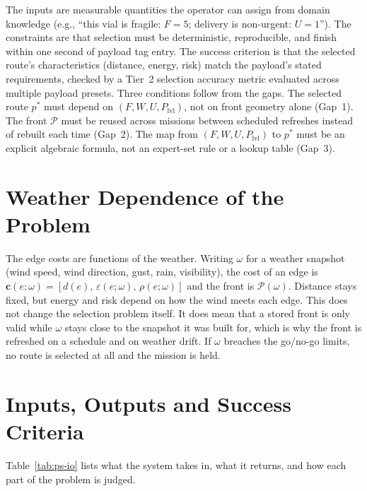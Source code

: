 \documentclass{ssnreview}
\begin{document}
The inputs are measurable quantities the operator can assign from domain knowledge (e.g.,
``this vial is fragile: $F = 5$; delivery is non-urgent: $U = 1$''). The constraints are
that selection must be deterministic, reproducible, and finish within one second of
payload tag entry. The success criterion is that the selected route's characteristics
(distance, energy, risk) match the payload's stated requirements, checked by a Tier~2
selection accuracy metric evaluated across multiple payload presets. Three conditions
follow from the gaps. The selected route $p^*$ must depend on $(F, W, U, P_\mathrm{lvl})$,
not on front geometry alone (Gap~1). The front $\mathcal{P}$ must be reused across
missions between scheduled refreshes instead of rebuilt each time (Gap~2). The map from
$(F, W, U, P_\mathrm{lvl})$ to $p^*$ must be an explicit algebraic formula, not an
expert-set rule or a lookup table (Gap~3).

\section{Weather Dependence of the Problem}

The edge costs are functions of the weather. Writing $\omega$ for a
weather snapshot (wind speed, wind direction, gust, rain, visibility), the cost of an
edge is $\mathbf{c}(e;\omega) = [d(e),\, \varepsilon(e;\omega),\, \rho(e;\omega)]$ and the
front is $\mathcal{P}(\omega)$. Distance stays fixed, but energy and risk depend on how
the wind meets each edge. This does not change the selection problem itself. It does mean
that a stored front is only valid while $\omega$ stays close to the snapshot it was built
for, which is why the front is refreshed on a schedule and on weather drift. If $\omega$
breaches the go/no-go limits, no route is selected at all and the mission is held.

\section{Inputs, Outputs and Success Criteria}

Table~\ref{tab:ps-io} lists what the system takes in, what it returns, and how each part
of the problem is judged.
\end{document}
